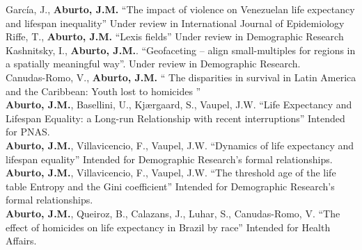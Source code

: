 \documentclass[12pt]{article}
\begin{document}
Garc\'ia, J., \textbf{Aburto, J.M.} ``The impact of violence on Venezuelan life expectancy and lifespan inequality''  Under review in International Journal of Epidemiology\\
  
 Riffe, T., \textbf{Aburto, J.M.} ``Lexis fields'' Under review in Demographic Research \\
 
 Kashnitsky, I., \textbf{Aburto, J.M.}. ``Geofaceting – align small-multiples for regions in a
spatially meaningful way''. Under review in Demographic Research.\\
 
 
Canudas-Romo, V., \textbf{Aburto, J.M.} `` The disparities in survival in Latin America and the Caribbean: 
 Youth lost to homicides '' \\
 
  
 \textbf{Aburto, J.M.}, Basellini, U., Kj{\ae}rgaard, S., Vaupel, J.W. ``Life Expectancy and Lifespan Equality:  a Long-run Relationship with recent interruptions'' Intended for PNAS. \\
 
  \textbf{Aburto, J.M.}, Villavicencio, F.,  Vaupel, J.W. ``Dynamics of life expectancy and lifespan equality'' Intended for Demographic Research's formal relationships. \\
  
  \textbf{Aburto, J.M.}, Villavicencio, F.,  Vaupel, J.W. ``The threshold age of the life table Entropy and the Gini coefficient'' Intended for Demographic Research's formal relationships. \\
  
  \textbf{Aburto, J.M.}, Queiroz, B.,  Calazans, J., Luhar, S., Canudas-Romo, V. ``The effect of homicides on life expectancy in Brazil by race'' Intended for Health Affairs. \\
  
  
 
 
\end{document}
